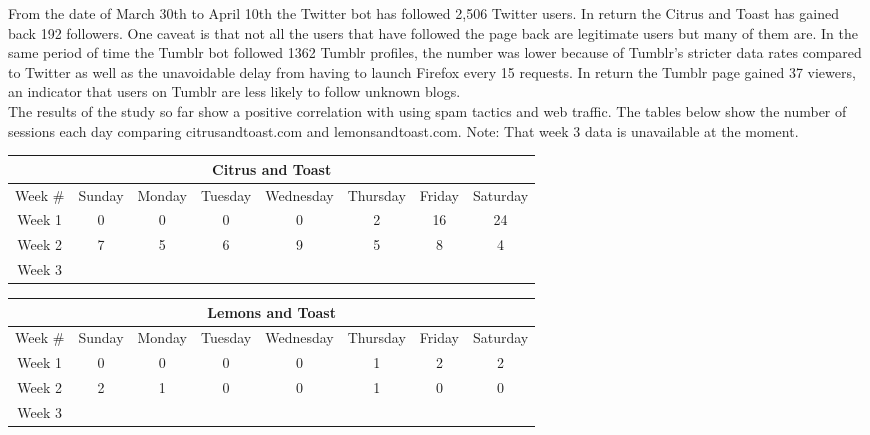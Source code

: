 \documentclass{article}
\begin{document}
From the date of March 30th to April 10th the Twitter bot has followed 2,506 Twitter users. In return the Citrus and Toast has gained back 192 followers. One caveat is that not all the users that have followed the page back are legitimate users but many of them are. In the same period of time the Tumblr bot followed 1362 Tumblr profiles, the number was lower because of Tumblr's stricter data rates compared to Twitter as well as the unavoidable delay from having to launch Firefox every 15 requests. In return the Tumblr page gained 37 viewers, an indicator that users on Tumblr are less likely to follow unknown blogs. 
\\
The results of the study so far show a positive correlation with using spam tactics and web traffic. The tables below show the number of sessions each day comparing citrusandtoast.com and lemonsandtoast.com. Note: That week 3 data is unavailable at the moment.
\newpage

\begin{adjustbox}{width=1.2\textwidth,center}
\begin{tabular}{| c | c | c | c | c | c | c | c |}
  \hline
  \multicolumn{8}{|c|}{Citrus and Toast} \\
  \hline
  Week \# & Sunday & Monday & Tuesday & Wednesday & Thursday & Friday & Saturday \\ 
  \hline
  Week 1 & 0 & 0 & 0 & 0 & 2 & 16 & 24 \\
  Week 2 & 7 & 5 & 6 & 9 & 5 & 8 & 4 \\
  Week 3 &  &  &  &  &  &  &  \\
  \hline
\end{tabular}
\end{adjustbox}

\vspace{0.5in}

\begin{adjustbox}{width=1.2\textwidth,center,caption={blah \\ blah}}
\begin{tabular}{| c | c | c | c | c | c | c | c |}
  \hline
  \multicolumn{8}{|c|}{Lemons and Toast} \\
  \hline
  Week \# & Sunday & Monday & Tuesday & Wednesday & Thursday & Friday & Saturday \\ 
  \hline
  Week 1 & 0 & 0 & 0 & 0 & 1 & 2 & 2 \\
  Week 2 & 2 & 1 & 0 & 0 & 1 & 0 & 0 \\
  Week 3 &  &  &  &  &  &  &  \\
  \hline
\end{tabular}
\end{adjustbox}
\end{document}
